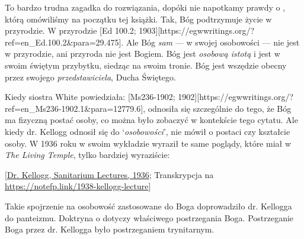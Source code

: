 To bardzo trudna zagadka do rozwiązania, dopóki nie napotkamy prawdy o , którą omówiliśmy na początku tej książki. Tak, Bóg podtrzymuje życie w przyrodzie. W przyrodzie [Ed 100.2; 1903][https://egwwritings.org/?ref=en\_Ed.100.2&para=29.475]. Ale Bóg \textit{sam} — w swojej osobowości — nie jest w przyrodzie, ani przyroda nie jest Bogiem. Bóg jest \textit{osobową istotą} i jest w swoim świętym przybytku, siedząc na swoim tronie. Bóg jest wszędzie obecny przez swojego \textit{przedstawiciela}, Ducha Świętego.

Kiedy siostra White powiedziała: [Ms236-1902; 1902][https://egwwritings.org/?ref=en\_Ms236-1902.1&para=12779.6], odnosiła się szczególnie do tego, że Bóg ma fizyczną postać osoby, co można było zobaczyć w kontekście tego cytatu. Ale kiedy dr. Kellogg odnosił się do ‘\textit{osobowości}’, nie mówił o postaci czy kształcie osoby. W 1936 roku w swoim wykładzie wyraził te same poglądy, które miał w \textit{The Living Temple}, tylko bardziej wyraziście:


[\href{https://forgotten-pillar.s3.us-east-2.amazonaws.com/Sanitarium+Lecture+1936.pdf}{Dr. Kellogg, Sanitarium Lectures, 1936}; Transkrypcja na \href{https://notefp.link/1938-kellogg-lecture}{https://notefp.link/1938-kellogg-lecture}]

Takie spojrzenie na osobowość zastosowane do Boga doprowadziło dr. Kellogga do panteizmu. Doktryna o  dotyczy właściwego postrzegania Boga. Postrzeganie Boga przez dr. Kellogga było postrzeganiem trynitarnym.

